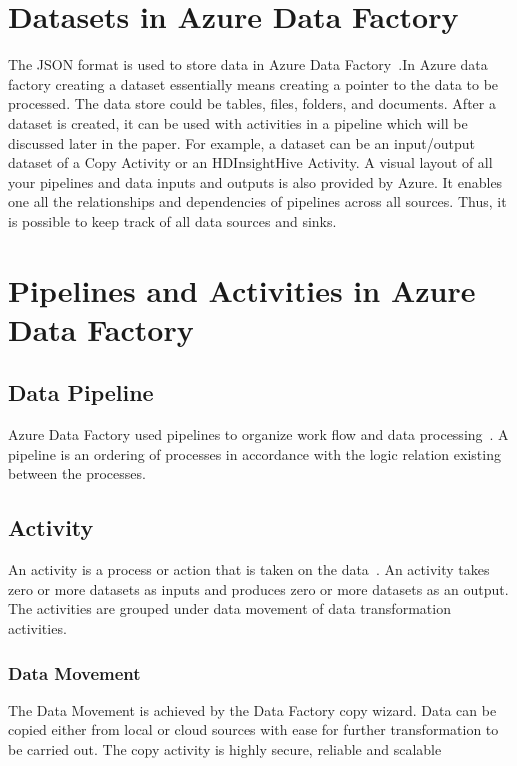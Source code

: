 \documentclass[9pt,twocolumn,twoside]{styles/osajnl}
\begin{document}
\section{Datasets in Azure Data Factory}

The JSON format is used to store data in Azure Data Factory~\cite{www-microsoft-azure-data}.In Azure data factory creating a dataset essentially means creating a pointer to the data to be processed.
The data store could be tables, files, folders, and documents. After a dataset is created, it can be used with activities in a pipeline which will be discussed later in the paper. For example, a dataset can be an input/output dataset of a Copy Activity or an HDInsightHive Activity. A visual layout of all your pipelines and data inputs and outputs is also provided by Azure. It enables one all the relationships and dependencies of  pipelines across all sources. Thus, it is possible to keep track of all data sources and sinks.

\section{Pipelines and Activities in Azure Data Factory}
\subsection{Data Pipeline}
Azure Data Factory used pipelines to organize work flow and data processing~\cite{www-microsoft-azure-pipelines}. A pipeline is an ordering of processes in accordance with the logic relation existing between the processes. 

\subsection{Activity} 
An activity is a process or action that is taken on the data~\cite{www-microsoft-azure-pipelines}. An activity takes zero or more datasets as inputs and produces zero or more datasets as an output. The activities are grouped under data movement of data transformation activities.

\subsubsection{Data Movement}
The Data Movement is achieved by the Data Factory copy wizard. Data can be copied either from local or cloud sources with ease for further transformation to be carried out. The copy activity is highly secure, reliable and scalable
\end{document}
